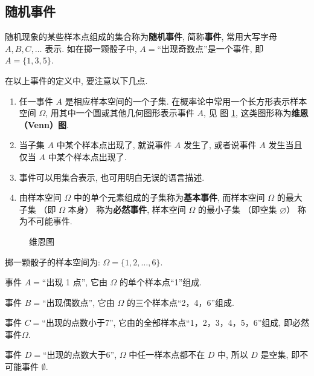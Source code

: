\subsection{随机事件}

随机现象的某些样本点组成的集合称为\textbf{随机事件},
简称\textbf{事件},
常用大写字母 $A, B, C, \dotsc$ 表示.
如在掷一颗骰子中,
$A=$“出现奇数点”是一个事件,
即 $A=\{1,3,5\}$.

在以上事件的定义中,
要注意以下几点.
\begin{enumerate}
  \item 任一事件 $A$ 是相应样本空间的一个子集.
  在概率论中常用一个长方形表示样本空间 $\Omega$,
  用其中一个圆或其他几何图形表示事件 $A$,
  见 图 \ref{fig1.1.1},
  这类图形称为\textbf{维恩（Venn）图}.
  \item 当子集 $A$ 中某个样本点出现了,
  就说事件 $A$ 发生了,
  或者说事件 $A$ 发生当且仅当 $A$ 中某个样本点出现了.
  \item 事件可以用集合表示,
  也可用明白无误的语言描述.
  \item 由样本空间 $\Omega$ 中的单个元素组成的子集称为\textbf{基本事件},
  而样本空间 $\Omega$ 的最大子集 （即 $\Omega$ 本身） 称为\textbf{必然事件},
  样本空间 $\Omega$ 的最小子集 （即空集 $\varnothing$） 称为不可能事件.
\end{enumerate}
\begin{figure}[!ht]
\centering
\caption{维恩图\label{fig1.1.1}}
\end{figure}

\begin{example}
  掷一颗骰子的样本空间为:
  $ \Omega = \{1,2,\dotsc,6\}$.

  事件 $A=$“出现 1 点”,
  它由 $\Omega$ 的单个样本点“1”组成.

  事件 $B=$“出现偶数点”,
  它由 $\Omega$ 的三个样本点“2，4，6”组成.

  事件 $C=$“出现的点数小于7”,
  它由的全部样本点“1，2，3，4，5，6”组成,
  即必然事件$\Omega$.

  事件 $D=$“出现的点数大于6”,
  $\Omega$ 中任一样本点都不在 $D$ 中,
  所以 $D$ 是空集,
  即不可能事件 $\emptyset$.
\end{example}

